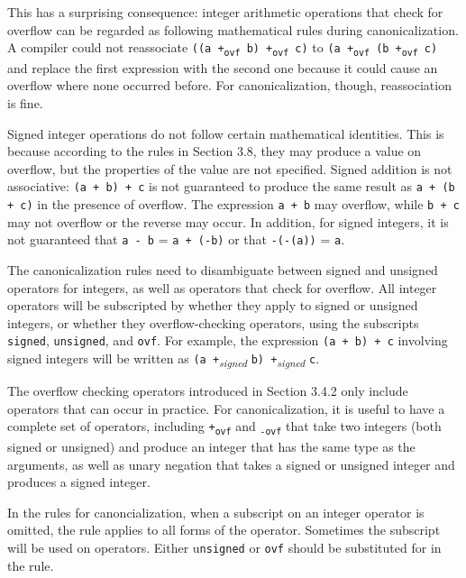 This has a surprising consequence: integer arithmetic operations that
check for overflow can be regarded as following mathematical rules
during canonicalization. A compiler could not reassociate \texttt{((a
+\textsubscript{ovf} b) +\textsubscript{ovf} c)} to \texttt{(a
+\textsubscript{ovf} (b +\textsubscript{ovf} c)} and replace the first
expression with the second one because it could cause an overflow where
none occurred before. For canonicalization, though, reassociation is
fine.

Signed integer operations do not follow certain mathematical identities.
This is because according to the rules in Section 3.8, they may produce
a value on overflow, but the properties of the value are not specified.
Signed addition is not associative: \texttt{(a + b) + c} is not
guaranteed to produce the same result as \texttt{a + (b + c)} in the
presence of overflow. The expression \texttt{a + b} may overflow, while
\texttt{b + c} may not overflow or the reverse may occur. In addition,
for signed integers, it is not guaranteed that \texttt{a - b} =
\texttt{a + (-b)} or that \texttt{-(-(a))} = \texttt{a}.

The canonicalization rules need to disambiguate between signed and
unsigned operators for integers, as well as operators that check for
overflow. All integer operators will be subscripted by whether they
apply to signed or unsigned integers, or whether they overflow-checking
operators, using the subscripts \texttt{signed}, \texttt{unsigned}, and
\texttt{ovf}. For example, the expression \texttt{(a + b) + c} involving
signed integers will be written as \texttt{(a
+}\emph{\textsubscript{signed}} \texttt{b)
+}\emph{\textsubscript{signed}} \texttt{c}.

The overflow checking operators introduced in Section 3.4.2 only include
operators that can occur in practice. For canonicalization, it is useful
to have a complete set of operators, including
\texttt{+\textsubscript{ovf}} and \texttt{\textsubscript{-ovf}} that
take two integers (both signed or unsigned) and produce an integer that
has the same type as the arguments, as well as unary negation that takes
a signed or unsigned integer and produces a signed integer.

In the rules for canoncialization, when a subscript on an integer
operator is omitted, the rule applies to all forms of the operator.
Sometimes the subscript  will be used on operators. Either
u\texttt{nsigned} or \texttt{ovf} should be substituted for 
in the rule.

